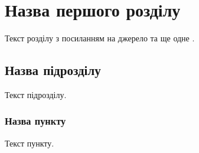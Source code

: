 \chapter{Назва першого розділу}

Текст розділу з посиланням на джерело \cite{makarova2002} та ще одне
\cite{rossokha2015, ifla2012}.

\section{Назва підрозділу}

Текст підрозділу.

\subsection{Назва пункту}

Текст пункту.

